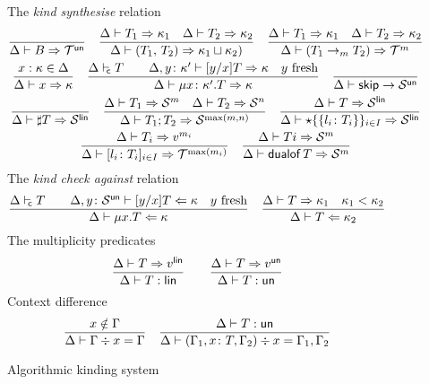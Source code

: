 \begin{figure}[h!]
  The \emph{kind synthesise} relation \hfill{}
  \begin{gather*}
    \frac{}{\algkindout{B}{\kindt^\un}}
    \quad 
    \frac{
      \algkindout{T_1}{\kind_1}
      \quad
      \algkindout{T_2}{\kind_2}
    }{
      \algkindout{\pairt{T_1}{T_2}}{\kind_1\join \kind_2)}
    }
    \quad
    \frac{
      \algkindout{T_1}{\kind_1}
      \quad
      \algkindout{T_2}{\kind_2}
    }{
      \algkindout{(\funt{T_1}{T_2})}{\kindt^m}
    }
    \\
    \frac{x : \kind \in \Delta}{\algkindout x \kind}
   \quad
  \frac{
    \isContr T
    \qquad
    \algkindout[\Delta, y\colon \kind'] {\subs yxT} \kind
    \quad
    y\text{ fresh}
  }{
    \algkindout{\rect {x\colon \kind'} T}{\kind}
  }
  \quad
  \frac{}{\Delta \Alg \skipt \rightarrow \kinds^\un}
  \\
  \frac{}{\algkindout{\msgt T}{\kinds^\lin}}
  \quad
  \frac{
    \algkindout{T_1}{\kinds^m}
    \quad
    \algkindout{T_2}{\kinds^n}
  }{
    \algkindout{\semit{T_1}{T_2}}{\kinds^{\max(m,n)}}
  }
  \quad
  \frac{
    \algkindout{T}{\kinds^\lin}
  }{
    \algkindout{\choicet{\{l_i\colon T_i\}}_{i\in I}}{\kinds^\lin}
  }
  \\
  \frac{
    \algkindout{T_i}{v^{m_i}}
  }{
    \algkindout{\datat{l_i\colon T_i}_{i\in I}}{\kindt^{\max(m_i)}}
  }  
  \quad
  \frac{
    \algkindout{Ti}{\kinds^m}
  }{
    \algkindout{\dualoft T}{\kinds^m}
  }
  \end{gather*}
  The \emph{kind check against} relation\hfill{}
  \begin{equation*}
    \frac{
      \isContr T
      \qquad
      \algkindin[\Delta, y\colon \kinds^\un] {\subs yxT} \kind
      \quad
      y\text{ fresh}
    }{
      \algkindin{\rect xT}{\kind}
    }
    \quad
    \frac{
      \algkindout{T}{\kind_1}
      \quad
      \isSubkind{\kind_1}{\kind_2}
    }{
      \algkindin T {\kind_2}
    }
  \end{equation*}
  The multiplicity predicates \hfill{}\quad{}
  \begin{equation*}
    \frac{
      \algkindout T {v^\lin}
    }{
      \isLin T
    }
    \qquad
    \frac{
      \algkindout T {v^\un}
    }{
      \isUn T
    }
  \end{equation*}
  Context difference \hfill{}
  \begin{equation*}
    \frac{
      x\notin\Gamma
    }{
      \ctxdiff \Gamma x \Gamma
    }
    \quad
    \frac{
      \isUn T
    }{
      \ctxdiff {(\Gamma_1,x\colon T,\Gamma_2)} x {\Gamma_1,\Gamma_2}
    }
  \end{equation*}
  \caption{Algorithmic kinding system}
  \label{fig:kinding-system}
\end{figure}

